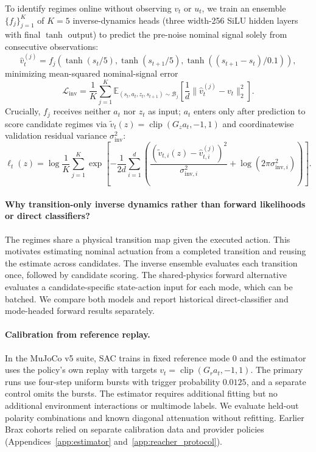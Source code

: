 \documentclass[twoside,11pt]{article}
\newcommand{\gain}{G}
\newcommand{\clip}{\operatorname{clip}}
\begin{document}
To identify regimes online without observing $v_t$ or $u_t$, we train an ensemble $\{f_j\}_{j=1}^{K}$ of $K=5$ inverse-dynamics heads (three width-256 SiLU hidden layers with final $\tanh$ output) to predict the pre-noise nominal signal solely from consecutive observations:
\begin{equation}
    \hat v_t^{(j)} = f_j\!\left(
        \tanh(s_t/5),\tanh(s_{t+1}/5),
        \tanh((s_{t+1}-s_t)/0.1)
    \right),
\end{equation}
minimizing mean-squared nominal-signal error
\begin{equation}
 \mathcal{L}_{\mathrm{inv}}
 =\frac{1}{K}\sum_{j=1}^{K}
 \mathbb{E}_{(s_t,a_t,z_t,s_{t+1})\sim\mathcal{B}_j}
 \left[\frac{1}{d}\|\hat v_t^{(j)}-v_t\|_2^2\right].
 \label{eq:inverse_loss}
\end{equation}
Crucially, $f_j$ receives neither $a_t$ nor $z_t$ as input; $a_t$ enters only after prediction to score candidate regimes via $\tilde v_t(z)=\clip(\gain_z a_t,-1,1)$ and coordinatewise validation residual variance $\sigma_{\mathrm{inv}}^2$:
\begin{equation}
    \ell_t(z)=\log\frac{1}{K}\sum_{j=1}^{K}
    \exp\left[-\frac{1}{2d}\sum_{i=1}^{d}
    \left(
      \frac{(\tilde v_{t,i}(z)-\hat v_{t,i}^{(j)})^2}{\sigma_{\mathrm{inv},i}^2}
      +\log(2\pi\sigma_{\mathrm{inv},i}^2)
    \right)\right].
    \label{eq:emission}
\end{equation}

\paragraph{Why transition-only inverse dynamics rather than forward likelihoods or direct classifiers?}
The regimes share a physical transition map given the executed action. This motivates estimating nominal actuation from a completed transition and reusing the estimate across candidates. The inverse ensemble evaluates each transition once, followed by candidate scoring. The shared-physics forward alternative evaluates a candidate-specific state-action input for each mode, which can be batched. We compare both models and report historical direct-classifier and mode-headed forward results separately.

\paragraph{Calibration from reference replay.}
In the MuJoCo v5 suite, SAC trains in fixed reference mode 0 and the estimator uses the policy's own replay with targets $v_t=\clip(\gain_r a_t,-1,1)$. The primary runs use four-step uniform bursts with trigger probability $0.0125$, and a separate control omits the bursts. The estimator requires additional fitting but no additional environment interactions or multimode labels. We evaluate held-out polarity combinations and known diagonal attenuation without refitting. Earlier Brax cohorts relied on separate calibration data and provider policies (Appendices~\ref{app:estimator} and~\ref{app:reacher_protocol}).
\end{document}
